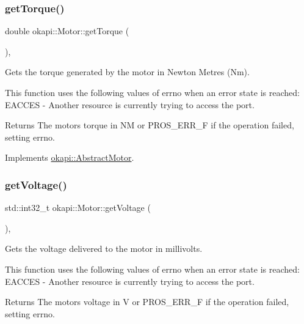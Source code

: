 \subsubsection{\texorpdfstring{getTorque()}{getTorque()}}
{\footnotesize\ttfamily double okapi\+::\+Motor\+::get\+Torque (\begin{DoxyParamCaption}{ }\end{DoxyParamCaption})\hspace{0.3cm}{\ttfamily [override]}, {\ttfamily [virtual]}}

Gets the torque generated by the motor in Newton Metres (Nm).

This function uses the following values of errno when an error state is reached\+: E\+A\+C\+C\+ES -\/ Another resource is currently trying to access the port.

\begin{DoxyReturn}{Returns}
The motor\textquotesingle{}s torque in NM or P\+R\+O\+S\+\_\+\+E\+R\+R\+\_\+F if the operation failed, setting errno. 
\end{DoxyReturn}


Implements \mbox{\hyperlink{classokapi_1_1AbstractMotor_a955818baa689b279b36dda6a74f15d4e}{okapi\+::\+Abstract\+Motor}}.

\mbox{\label{classokapi_1_1Motor_af60eb970996183d86bd4786869f5adb0}} 
\subsubsection{\texorpdfstring{getVoltage()}{getVoltage()}}
{\footnotesize\ttfamily std\+::int32\+\_\+t okapi\+::\+Motor\+::get\+Voltage (\begin{DoxyParamCaption}{ }\end{DoxyParamCaption})\hspace{0.3cm}{\ttfamily [override]}, {\ttfamily [virtual]}}

Gets the voltage delivered to the motor in millivolts.

This function uses the following values of errno when an error state is reached\+: E\+A\+C\+C\+ES -\/ Another resource is currently trying to access the port.

\begin{DoxyReturn}{Returns}
The motor\textquotesingle{}s voltage in V or P\+R\+O\+S\+\_\+\+E\+R\+R\+\_\+F if the operation failed, setting errno. 
\end{DoxyReturn}


